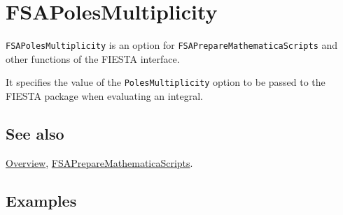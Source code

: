 \documentclass[../FeynHelpersManual.tex]{subfiles}
\begin{document}
\begin{Shaded}
\begin{Highlighting}[]
 
\end{Highlighting}
\end{Shaded}

\hypertarget{fsapolesmultiplicity}{
\section{FSAPolesMultiplicity}\label{fsapolesmultiplicity}}

\texttt{FSAPolesMultiplicity} is an option for
\texttt{FSAPrepareMathematicaScripts} and other functions of the FIESTA
interface.

It specifies the value of the \texttt{PolesMultiplicity} option to be
passed to the FIESTA package when evaluating an integral.

\subsection{See also}

\hyperlink{toc}{Overview},
\hyperlink{fsapreparemathematicascripts}{FSAPrepareMathematicaScripts}.

\subsection{Examples}
\end{document}

